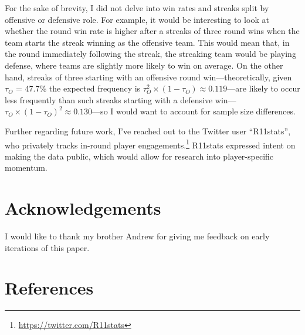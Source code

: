 \documentclass{article}
\begin{document}
For the sake of brevity, I did not delve into win rates and streaks
split by offensive or defensive role. For example, it would be
interesting to look at whether the round win rate is higher after a
streaks of three round wins when the team starts the streak winning as
the offensive team. This would mean that, in the round immediately
following the streak, the streaking team would be playing defense, where
teams are slightly more likely to win on average. On the other hand,
streaks of three starting with an offensive round win---theoretically,
given \(\tau_O\) = 47.7\% the expected frequency is
\(\tau_O^2 \times (1 - \tau_O) \approx 0.119\)---are likely to occur
less frequently than such streaks starting with a defensive
win---\(\tau_O \times (1 - \tau_O)^2 \approx 0.130\)---so I would want
to account for sample size differences.

Further regarding future work, I've reached out to the Twitter user
``R11stats'', who privately tracks in-round player
engagements.\footnote{\url{https://twitter.com/R11stats}} R11stats
expressed intent on making the data public, which would allow for
research into player-specific momentum.

\hypertarget{acknowledgements}{%
\section*{Acknowledgements}\label{acknowledgements}}

I would like to thank my brother Andrew for giving me feedback on early
iterations of this paper.

\hypertarget{references}{%
\section*{References}\label{references}}
\end{document}
